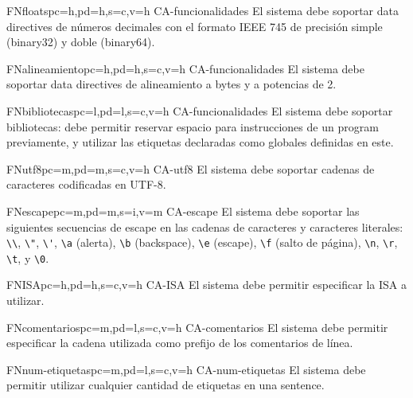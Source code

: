 \begin{softwareReq}{FN}{floats}{pc=h,pd=h,s=c,v=h}
    {CA-funcionalidades}
    El sistema debe soportar \glspl{data directive} de números decimales con el
    formato IEEE 745 \parencite{FloatsIEEE} de precisión simple (binary32) y
    doble (binary64).
\end{softwareReq}

\begin{softwareReq}{FN}{alineamiento}{pc=h,pd=h,s=c,v=h}
    {CA-funcionalidades}
    El sistema debe soportar \glspl{data directive} de alineamiento a bytes y a
    potencias de 2.
\end{softwareReq}

\begin{softwareReq}{FN}{bibliotecas}{pc=l,pd=l,s=c,v=h}
    {CA-funcionalidades}
    El sistema debe soportar bibliotecas: debe permitir reservar espacio para
    instrucciones de un \gls{program} 
    previamente, y utilizar las etiquetas declaradas como globales definidas en
    este.
\end{softwareReq}

\begin{softwareReq}{FN}{utf8}{pc=m,pd=m,s=c,v=h}
    {CA-utf8}
    El sistema debe soportar cadenas de caracteres codificadas en UTF-8.
\end{softwareReq}

\begin{softwareReq}{FN}{escape}{pc=m,pd=m,s=i,v=m}
    {CA-escape}
    El sistema debe soportar las siguientes secuencias de escape en las cadenas
    de caracteres y caracteres literales: \verb!\\!, \verb!\"!, \verb!\'!,
    \verb!\a! (alerta), \verb!\b! (backspace), \verb!\e! (escape), \verb!\f!
    (salto de página), \verb!\n!, \verb!\r!, \verb!\t!, y \verb!\0!.
\end{softwareReq}

\begin{softwareReq}{FN}{ISA}{pc=h,pd=h,s=c,v=h}
    {CA-ISA}
    El sistema debe permitir especificar la \gls{ISA} a utilizar.
\end{softwareReq}

\begin{softwareReq}{FN}{comentarios}{pc=m,pd=l,s=c,v=h}
    {CA-comentarios}
    El sistema debe permitir especificar la cadena utilizada como prefijo de los
    comentarios de línea.
\end{softwareReq}

\begin{softwareReq}{FN}{num-etiquetas}{pc=m,pd=l,s=c,v=h}
    {CA-num-etiquetas}
    El sistema debe permitir utilizar cualquier cantidad de etiquetas en una
    \gls{sentence}.
\end{softwareReq}


